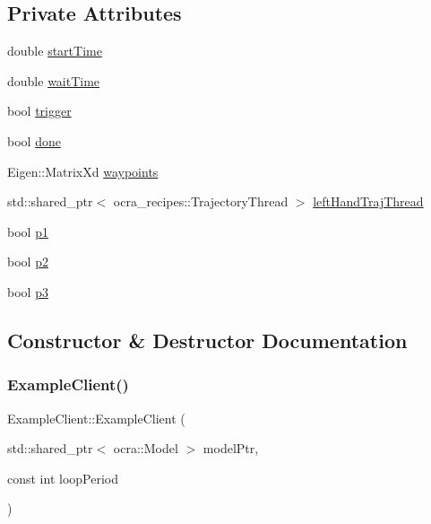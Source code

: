 \subsection*{Private Attributes}
\begin{DoxyCompactItemize}
\item 
double \hyperlink{classExampleClient_aaa5ec782e9aaa1e94d7182872f743c02}{start\+Time}
\item 
double \hyperlink{classExampleClient_acade7035d4e39290cbda08b98249a629}{wait\+Time}
\item 
bool \hyperlink{classExampleClient_a90ce0c4d970c903b3e6afb6f5ca2a228}{trigger}
\item 
bool \hyperlink{classExampleClient_acd2cf0f0479ff8bbf5b64924d83beb60}{done}
\item 
Eigen\+::\+Matrix\+Xd \hyperlink{classExampleClient_acf4657277ecb08168d9a17c208814823}{waypoints}
\item 
std\+::shared\+\_\+ptr$<$ ocra\+\_\+recipes\+::\+Trajectory\+Thread $>$ \hyperlink{classExampleClient_a4311b0e8c4878c23df2b5ba048d8bc05}{left\+Hand\+Traj\+Thread}
\item 
bool \hyperlink{classExampleClient_a7fb2b50cbdac0ec3a32e44b5bbc3b11f}{p1}
\item 
bool \hyperlink{classExampleClient_a07c2bc5c5c522e77a726017c28db2ec9}{p2}
\item 
bool \hyperlink{classExampleClient_ab41df6f34a51e649051adbac6d3077f9}{p3}
\end{DoxyCompactItemize}


\subsection{Constructor \& Destructor Documentation}
\hypertarget{classExampleClient_aed7d851662cba1484ecf1db8161d6e62}{}\label{classExampleClient_aed7d851662cba1484ecf1db8161d6e62} 
\subsubsection{\texorpdfstring{Example\+Client()}{ExampleClient()}}
{\footnotesize\ttfamily Example\+Client\+::\+Example\+Client (\begin{DoxyParamCaption}\item[{std\+::shared\+\_\+ptr$<$ ocra\+::\+Model $>$}]{model\+Ptr,  }\item[{const int}]{loop\+Period }\end{DoxyParamCaption})}

